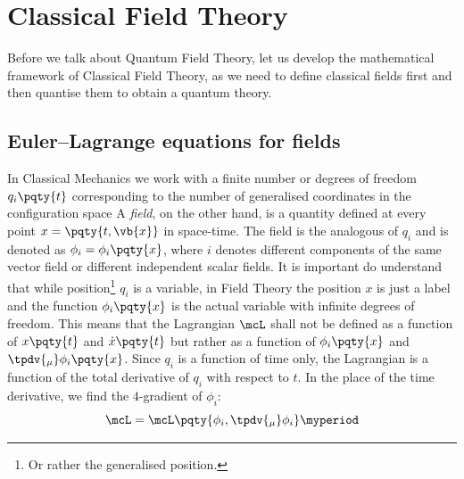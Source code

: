 \chapter{Classical Field Theory}
    Before we talk about Quantum Field Theory, let us develop the mathematical framework of Classical Field Theory, as we need to define classical fields first and then quantise them to obtain a quantum theory.

    \section{Euler--Lagrange equations for fields}
        In Classical Mechanics we work with a finite number or degrees of freedom $q_i\pqty{t}$ corresponding to the number of generalised coordinates in the configuration space
        A \emph{field}, on the other hand, is a quantity defined at every point $x = \pqty{t, \vb{x}}$ in space-time.
        The field is the analogous of $q_i$ and is denoted as $\phi_i = \phi_i\pqty{x}$, where $i$ denotes different components of the same vector field or different independent scalar fields.
        It is important do understand that while position\footnote{Or rather the generalised position.} $q_i$ is a variable, in Field Theory the position $x$ is just a label and the function $\phi_i\pqty{x}$ is the actual variable with infinite degrees of freedom.
        This means that the Lagrangian $\mcL$ shall not be defined as a function of $x\pqty{t}$ and $\dot{x}\pqty{t}$ but rather as a function of $\phi_i\pqty{x}$ and $\tpdv{_\mu}\phi_i\pqty{x}$.
        Since $q_i$ is a function of time only, the Lagrangian is a function of the total derivative of $q_i$ with respect to $t$.
        In the place of the time derivative, we find the $4$-gradient of $\phi_i$:
        \begin{equation}
            \mcL = \mcL\pqty{\phi_i,\tpdv{_\mu}\phi_i}
            \myperiod
        \end{equation}
        
